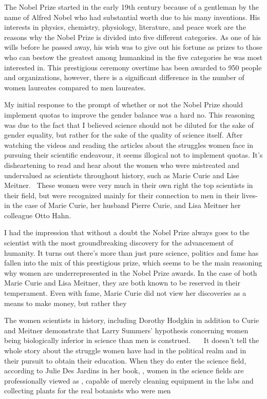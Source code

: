 
\par
The Nobel Prize started in the early 19th century because of a gentleman by the name of Alfred Nobel who had 
substantial worth due to his many inventions. His interests in physics, chemistry, physiology, literature, 
and peace work are the reasons why the Nobel Prize is divided into five different categories. As one of his 
wills before he passed away, his wish was to give out his fortune as prizes to those who can bestow the 
greatest among humankind in the five categories he was most interested in. This prestigious ceremony overtime 
has been awarded to 950 people and organizations, however, there is a significant difference in the number of 
women laureates compared to men laureates.

\par
My initial response to the prompt of whether or not the Nobel Prize should implement quotas to improve the 
gender balance was a hard no. This reasoning was due to the fact that I believed science should not be 
diluted for the sake of gender equality, but rather for the sake of the quality of science itself. After 
watching the videos and reading the articles about the struggles women face in pursuing their scientific 
endeavour, it seems illogical not to implement quotas. It’s disheartening to read and hear about the women 
who were mistreated and undervalued as scientists throughout history, such as Marie Curie and Lise Meitner.\cite{kopievanpbs}~\cite{jardins}
These women were very much in their own right the top scientists in their field, but were recognized mainly for 
their connection to men in their lives-in the case of Marie Curie, her husband Pierre Curie, and Lisa Meitner 
her colleague Otto Hahn.

\par
I had the impression that without a doubt the Nobel Prize always goes to the scientist with the most groundbreaking 
discovery for the advancement of humanity. It turns out there’s more than just pure science, politics and fame has 
fallen into the mix of this prestigious prize, which seems to be the main reasoning why women are underrepresented 
in the Nobel Prize awards. In the case of both Marie Curie and Lisa Meitner, they are both known to be reserved in 
their temperament. Even with fame, Marie Curie did not view her discoveries as a means to make money, but rather 
they \cite{jardins}

\par
The women scientists in history, including Dorothy Hodgkin in addition to Curie and Meitner demonstrate that Larry 
Summers’ hypothesis concerning women being biologically inferior in science than men is construed.~\cite{dorothy1}~\cite{dorothy2}~\cite{jardins}
It doesn’t tell the whole story about the struggle women have had in the political realm and in their pursuit to obtain 
their education. When they do enter the science field, according to Julie Des Jardins in her book, , women in the science fields are professionally viewed as ,\cite{jardins} capable of merely cleaning equipment in the labs and collecting 
plants for the real botanists who were men

